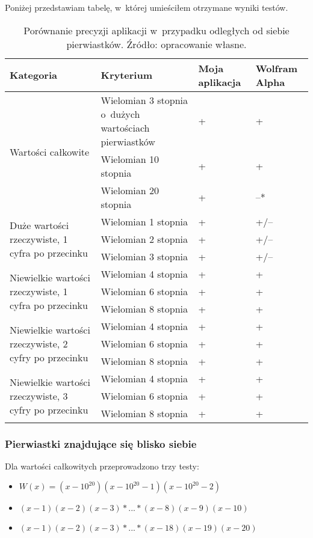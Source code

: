 Poniżej przedstawiam tabelę, w~której umieściłem otrzymane wyniki testów.

\begin{table}[H]
	\begin{tabular}{ |p{5cm}|p{5cm}|p{1.5cm}|p{1.5cm}| } 
		\hline
		Kategoria & Kryterium & Moja aplikacja & Wolfram Alpha \\
		\hline
		\multirow{3}{*}{Wartości całkowite}
		& Wielomian 3 stopnia o~dużych wartościach pierwiastków & + & + \\
		& Wielomian 10 stopnia & + & + \\
		& Wielomian 20 stopnia & + & --* \\
		\hline
		\multirow{3}{12em}{Duże wartości rzeczywiste, 1 cyfra po przecinku}
		& Wielomian 1 stopnia & + & +/-- \\
		& Wielomian 2 stopnia & + & +/-- \\
		& Wielomian 3 stopnia & + & +/-- \\
		\hline
		\multirow{3}{14em}{Niewielkie wartości rzeczywiste, 1 cyfra po przecinku}
		& Wielomian 4 stopnia & + & + \\
		& Wielomian 6 stopnia & + & + \\
		& Wielomian 8 stopnia & + & + \\
		\hline
		\multirow{3}{14em}{Niewielkie wartości rzeczywiste, 2 cyfry po przecinku}
		& Wielomian 4 stopnia & + & + \\
		& Wielomian 6 stopnia & + & + \\
		& Wielomian 8 stopnia & + & + \\
		\hline
		\multirow{3}{14em}{Niewielkie wartości rzeczywiste, 3 cyfry po przecinku}
		& Wielomian 4 stopnia & + & + \\
		& Wielomian 6 stopnia & + & + \\
		& Wielomian 8 stopnia & + & + \\
		\hline
	\end{tabular}
	\caption{Porównanie precyzji aplikacji w~przypadku odległych od siebie pierwiastków. Źródło: opracowanie własne.}
\end{table}

\subsubsection {Pierwiastki znajdujące się blisko siebie}

Dla wartości całkowitych przeprowadzono trzy testy:
\begin{itemize}
	\item $W(x)=(x-10^{20})(x-10^{20}-1)(x-10^{20}-2)$
	\item $(x-1)(x-2)(x-3)*...*(x-8)(x-9)(x-10)$
	\item $(x-1)(x-2)(x-3)*...*(x-18)(x-19)(x-20)$
\end{itemize}


